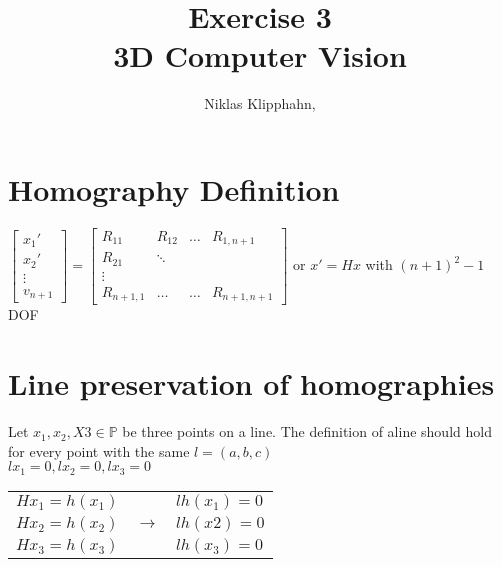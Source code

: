 \documentclass[a4paper, twoside, english]{article}
\title{Exercise 3 \\ 3D Computer Vision}  %
\author{Niklas Klipphahn,\\
}                       %
\begin{document}
	
\maketitle

\section{Homography Definition}
$
\begin{bmatrix}
	x_1'\\
	x_2'\\
	\vdots\\
	v_{n+1}
\end{bmatrix}
= 
\begin{bmatrix}
	R_{11} & R_{12} & \dots & R_{1,n+1}\\
	R_{21} & \ddots \\
	\vdots \\
	R_{n+1,1} & \dots & \dots & R_{n+1,n+1}
\end{bmatrix}
$
or $x' = Hx$ with $(n+1)^2 -1$ DOF

\section{Line preservation of homographies}

Let $x_1,x_2,X3 \in \mathbb{P}$ be three points on a line.
The definition of aline should hold for every point with the same $l=(a,b,c)$\\
$l x_1 = 0, l x_2 = 0, l x_3 = 0$\\

\begin{tabular}{lll}
$H x_1 = h(x_1)$ & &$ l h(x_1)=0$\\
$H x_2 = h(x_2)$ & $\rightarrow$ & $l h(x2) = 0$\\
$H x_3 = h(x_3)$ & & $l h(x_3) = 0$	
\end{tabular}
\end{document}
